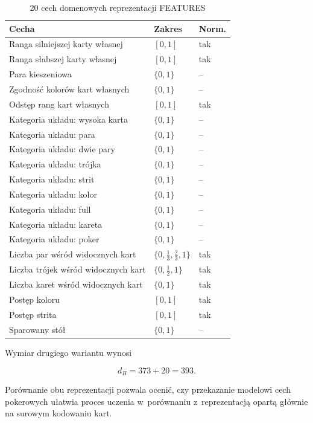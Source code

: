 \begin{table}[htbp]
\centering
\small
\setlength{\tabcolsep}{6pt}
\caption{20 cech domenowych reprezentacji FEATURES}
\label{tab:features-20}
\begin{tabular}{@{}p{}p{}p{}@{}}
\toprule
Cecha & Zakres & Norm. \\
\midrule
Ranga silniejszej karty własnej & $[0,1]$ & tak \\
Ranga słabszej karty własnej & $[0,1]$ & tak \\
Para kieszeniowa & $\{0,1\}$ & -- \\
Zgodność kolorów kart własnych & $\{0,1\}$ & -- \\
Odstęp rang kart własnych & $[0,1]$ & tak \\
\addlinespace
Kategoria układu: wysoka karta & $\{0,1\}$ & -- \\
Kategoria układu: para & $\{0,1\}$ & -- \\
Kategoria układu: dwie pary & $\{0,1\}$ & -- \\
Kategoria układu: trójka & $\{0,1\}$ & -- \\
Kategoria układu: strit & $\{0,1\}$ & -- \\
Kategoria układu: kolor & $\{0,1\}$ & -- \\
Kategoria układu: full & $\{0,1\}$ & -- \\
Kategoria układu: kareta & $\{0,1\}$ & -- \\
Kategoria układu: poker & $\{0,1\}$ & -- \\
\addlinespace
Liczba par wśród widocznych kart & $\{0,\tfrac13,\tfrac23,1\}$ & tak \\
Liczba trójek wśród widocznych kart & $\{0,\tfrac12,1\}$ & tak \\
Liczba karet wśród widocznych kart & $\{0,1\}$ & tak \\
Postęp koloru & $[0,1]$ & tak \\
Postęp strita & $[0,1]$ & tak \\
Sparowany stół & $\{0,1\}$ & -- \\
\bottomrule
\end{tabular}
\end{table}

Wymiar drugiego wariantu wynosi

\begin{equation}
    d_B = 373 + 20 = 393.
    \label{eq:state-b-dim}
\end{equation}

Porównanie obu reprezentacji pozwala ocenić, czy przekazanie modelowi
cech pokerowych ułatwia proces uczenia w~porównaniu z~reprezentacją opartą
głównie na surowym kodowaniu kart.
